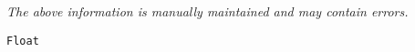 \label{pkg:eight\_byte\_float}

{\tiny \it The above information is manually maintained and may contain errors.}
\begin{verbatim}
Float
\end{verbatim}
